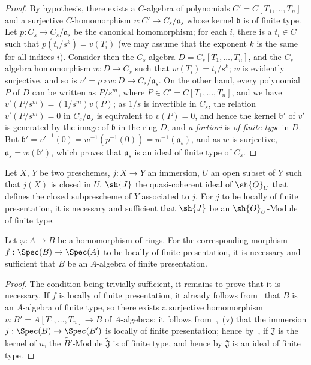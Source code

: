 \begin{proof}
By hypothesis, there exists a $C$-algebra of polynomials $C'=C[T_1,\ldots,T_n]$ and a surjective $C$-homomorphism $v:C'\to C_s/\mathfrak{a}_s$ whose kernel $\mathfrak{b}$ is of finite type.
Let $p:C_s\to C_s/\mathfrak{a}_s$ be the canonical homomorphism; for each $i$, there is a $t_i\in C$ such that $p(t_i/s^k)=v(T_i)$ (we may assume that the exponent $k$ is the same for all indices $i$).
Consider then the $C_s$-algebra $D=C_s[T_1,\ldots,T_n]$, and the $C_s$-algebra homomorphism $w:D\to C_s$ such that $w(T_i)=t_i/s^k$; $w$ is evidently surjective, and so is $v'=p\circ w:D\to C_s/\mathfrak{a}_s$.
On the other hand, every polynomial $P$ of $D$ can be written as $P/s^m$, where $P\in C'=C[T_1,\ldots,T_n]$, and we have $v'(P/s^m)=(1/s^m)v(P)$; as $1/s$ is invertible in $C_s$, the relation $v'(P/s^m)=0$ in $C_s/\mathfrak{a}_s$ is equivalent to $v(P)=0$, and hence the kernel $\mathfrak{b}'$ of $v'$ is generated by the image of $\mathfrak{b}$ in the ring $D$, and \emph{a fortiori} is \emph{of finite type} in $D$.
But $\mathfrak{b}'=v'^{-1}(0)=w^{-1}(p^{-1}(0))=w^{-1}(\mathfrak{a}_s)$, and as $w$ is surjective, $\mathfrak{a}_s=w(\mathfrak{b}')$, which proves that $\mathfrak{a}_s$ is an ideal of finite type of $C_s$.
\end{proof}

\begin{corollary}[1.4.5]
\label{IV.1.4.5}
Let $X$, $Y$ be two preschemes, $j:X\to Y$ an immersion, $U$ an open subset of $Y$ such that $j(X)$ is closed in $U$, $\sh{J}$ the quasi-coherent ideal of $\sh{O}_U$ that defines the closed subprescheme of $Y$ associated to $j$.
For $j$ to be locally of finite presentation, it is necessary and sufficient that $\sh{J}$ be an $\sh{O}_U$-Module of finite type.
\end{corollary}

\begin{proposition}[1.4.6]
\label{IV.1.4.6}
Let $\varphi:A\to B$ be a homomorphism of rings.
For the corresponding morphism $f:\Spec(B)\to\Spec(A)$ to be locally of finite presentation, it is necessary and sufficient that $B$ be an $A$-algebra of finite presentation.
\end{proposition}

\begin{proof}
The condition being trivially sufficient, it remains to prove that it is necessary.
If $f$ is locally of finite presentation, it already follows from~ that $B$ is an $A$-algebra
of finite type, so there exists a surjective homomorphism $u:B'=A[T_1,\ldots,T_n]\to B$ of $A$-algebras; it follows from~,~(v) that the immersion $j:\Spec(B)\to\Spec(B')$ is locally of finite presentation; hence by~, if $\mathfrak{J}$ is the kernel of $u$, the $\widetilde{B'}$-Module $\widetilde{\mathfrak{J}}$ is of finite type, and hence by  $\mathfrak{J}$ is an ideal of finite type.
\end{proof}

